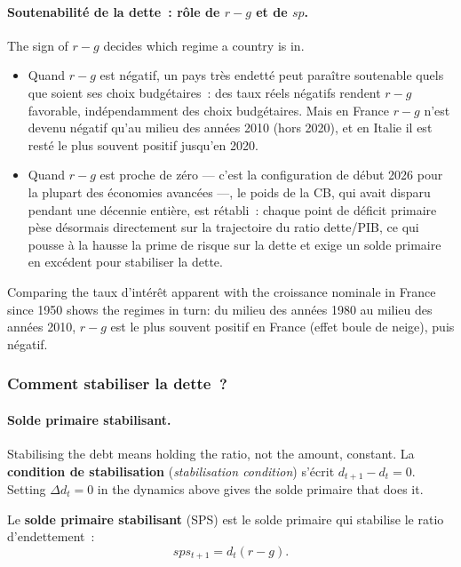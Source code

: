 \paragraph{Soutenabilité de la dette~: rôle de $r - g$ et de $sp$.}
The sign of $r - g$ decides which regime a country is in.
\begin{itemize}
  \item Quand $r - g$ est négatif, un pays très endetté peut paraître soutenable
    quels que soient ses choix budgétaires~: des taux réels négatifs rendent
    $r - g$ favorable, indépendamment des choix budgétaires. Mais en France
    $r - g$ n'est devenu négatif qu'au milieu des années 2010 (hors 2020), et en
    Italie il est resté le plus souvent positif jusqu'en 2020.
  \item Quand $r - g$ est proche de zéro --- c'est la configuration de début
    2026 pour la plupart des économies avancées ---, le poids de la CB, qui
    avait disparu pendant une décennie entière, est rétabli~: chaque point de
    déficit primaire pèse désormais directement sur la trajectoire du ratio
    dette/PIB, ce qui pousse à la hausse la prime de risque sur la dette et
    exige un solde primaire en excédent pour stabiliser la dette.
\end{itemize}
Comparing the taux d'intérêt apparent with the croissance nominale in France
since 1950 shows the regimes in turn: du milieu des années 1980 au milieu des années
2010, $r - g$ est le plus souvent positif en France (effet boule de neige), puis
négatif.

\subsubsection{Comment stabiliser la dette~?}

\paragraph{Solde primaire stabilisant.}
Stabilising the debt means holding the ratio, not the amount, constant. La
\textbf{condition de stabilisation} (\textit{stabilisation condition}) s'écrit
$d_{t+1} - d_t = 0$. Setting $\Delta d_t = 0$ in the dynamics above gives the
solde primaire that does it.

\begin{definition}
  Le \textbf{solde primaire stabilisant} (SPS) est le solde primaire qui
  stabilise le ratio d'endettement~:
  \[ sps_{t+1} = d_t(r - g). \]
\end{definition}


